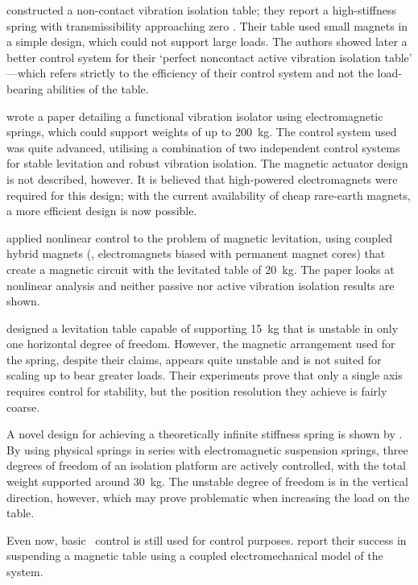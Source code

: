 \textcite{nagaya1993} constructed a non-contact vibration isolation table;
they report a high-stiffness spring with transmissibility approaching zero
. Their table used small magnets in a simple design, which could not
support large loads. The authors showed later a better control system for
their `perfect noncontact active vibration isolation table'
\cite{nagaya1995a}—which refers strictly to the efficiency of their control
system and not the load-bearing abilities of the table.

\textcite{watanabe1996} wrote a paper detailing a functional vibration
isolator using electromagnetic springs, which could support weights of up to
\SI{200}{kg}. The control system used was quite advanced, utilising a
combination of two independent control systems for stable levitation and
robust vibration isolation. The magnetic actuator design is not described,
however. It is believed that high-powered electromagnets were required for
this design; with the current availability of cheap rare-earth magnets, a more
efficient design is now possible.

\textcite{chang2001} applied nonlinear control to the problem of magnetic
levitation, using coupled hybrid magnets (\ie, electromagnets biased with
permanent magnet cores) that create a magnetic circuit with the levitated
table of \SI{20}{kg}. The paper looks at nonlinear analysis and neither
passive nor active vibration isolation results are shown.

\textcite{choi2003} designed a levitation table capable of supporting
\SI{15}{kg} that is unstable in only one horizontal degree of freedom.
However, the magnetic arrangement used for the spring, despite their claims,
appears quite unstable and is not suited for scaling up to bear greater loads.
Their experiments prove that only a single axis requires control for
stability, but the position resolution they achieve is fairly coarse.

A novel design for achieving a theoretically infinite stiffness spring is
shown by \textcite{mizuno2003a,mizuno2003b}. By using physical springs in
series with electromagnetic suspension springs, three degrees of freedom of an
isolation platform are actively controlled, with the total weight supported
around \SI{30}{kg}. The unstable degree of freedom is in the vertical
direction, however, which may prove problematic when increasing the load on
the table.

Even now, basic \PID\ control is still used for control
purposes. \textcite{li2007} report their success in suspending
a magnetic table using a coupled electromechanical model of
the system.

